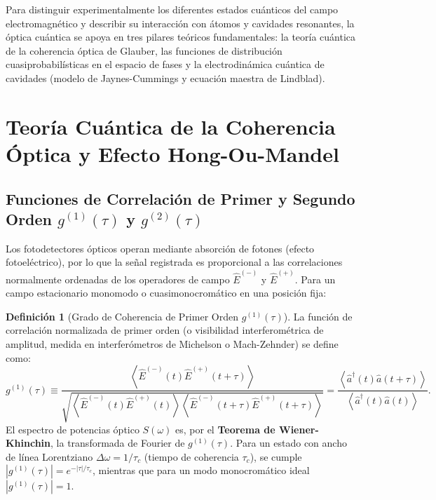 \documentclass[11pt,a4paper,twoside]{report}
\theoremstyle{definition}
\newtheorem{definicion}{Definición}[chapter]
\theoremstyle{plain}
\theoremstyle{remark}
\newcommand{\expval}[1]{\left\langle #1 \right\rangle}
\newcommand{\op}[1]{\hat{#1}}
\begin{document}
Para distinguir experimentalmente los diferentes estados cuánticos del campo electromagnético y describir su interacción con átomos y cavidades resonantes, la óptica cuántica se apoya en tres pilares teóricos fundamentales: la teoría cuántica de la coherencia óptica de Glauber, las funciones de distribución cuasiprobabilísticas en el espacio de fases y la electrodinámica cuántica de cavidades (modelo de Jaynes-Cummings y ecuación maestra de Lindblad).

\section{Teoría Cuántica de la Coherencia Óptica y Efecto Hong-Ou-Mandel}

\subsection{\texorpdfstring{Funciones de Correlación de Primer y Segundo Orden $g^{(1)}(\tau)$ y $g^{(2)}(\tau)$}{Funciones de Correlación de Primer y Segundo Orden g(1)(tau) y g(2)(tau)}}

Los fotodetectores ópticos operan mediante absorción de fotones (efecto fotoeléctrico), por lo que la señal registrada es proporcional a las correlaciones normalmente ordenadas de los operadores de campo $\op{E}^{(-)}$ y $\op{E}^{(+)}$. Para un campo estacionario monomodo o cuasimonocromático en una posición fija:

\begin{definicion}[Grado de Coherencia de Primer Orden $g^{(1)}(\tau)$]
La función de correlación normalizada de primer orden (o visibilidad interferométrica de amplitud, medida en interferómetros de Michelson o Mach-Zehnder) se define como:
\begin{equation}
    g^{(1)}(\tau) \equiv \frac{\expval{\op{E}^{(-)}(t)\op{E}^{(+)}(t+\tau)}}{\sqrt{\expval{\op{E}^{(-)}(t)\op{E}^{(+)}(t)}\expval{\op{E}^{(-)}(t+\tau)\op{E}^{(+)}(t+\tau)}}} = \frac{\expval{\op{a}^\dagger(t)\op{a}(t+\tau)}}{\expval{\op{a}^\dagger(t)\op{a}(t)}}.
\end{equation}
El espectro de potencias óptico $S(\omega)$ es, por el \textbf{Teorema de Wiener-Khinchin}, la transformada de Fourier de $g^{(1)}(\tau)$. Para un estado con ancho de línea Lorentziano $\Delta\omega = 1/\tau_c$ (tiempo de coherencia $\tau_c$), se cumple $|g^{(1)}(\tau)| = e^{-|\tau|/\tau_c}$, mientras que para un modo monocromático ideal $|g^{(1)}(\tau)| = 1$.
\end{definicion}
\end{document}
